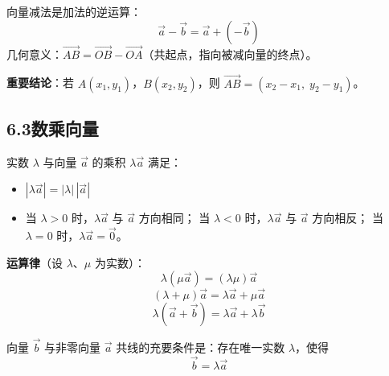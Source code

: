 \documentclass[12pt, a4paper]{ctexart}
\begin{document}
\begin{knowledgebox}[向量减法]
向量减法是加法的逆运算：
\[
\vec{a} - \vec{b} = \vec{a} + (-\vec{b})
\]
几何意义：$\overrightarrow{AB} = \overrightarrow{OB} - \overrightarrow{OA}$（共起点，指向被减向量的终点）。

\medskip
\textbf{重要结论}：若 $A(x_1,y_1)$，$B(x_2,y_2)$，则
$\overrightarrow{AB} = (x_2 - x_1,\; y_2 - y_1)$。
\end{knowledgebox}

\begin{center}
\end{center}

\subsection*{6.3\quad 数乘向量}

\begin{knowledgebox}[数乘向量的定义与运算律]
实数 $\lambda$ 与向量 $\vec{a}$ 的乘积 $\lambda\vec{a}$ 满足：
\begin{itemize}[leftmargin=2em]
  \item $|\lambda\vec{a}| = |\lambda|\,|\vec{a}|$
  \item 当 $\lambda > 0$ 时，$\lambda\vec{a}$ 与 $\vec{a}$ 方向相同；
        当 $\lambda < 0$ 时，$\lambda\vec{a}$ 与 $\vec{a}$ 方向相反；
        当 $\lambda = 0$ 时，$\lambda\vec{a} = \vec{0}$。
\end{itemize}

\medskip
\textbf{运算律}（设 $\lambda$、$\mu$ 为实数）：
\[
\lambda(\mu\vec{a}) = (\lambda\mu)\vec{a}
\]
\[
(\lambda + \mu)\vec{a} = \lambda\vec{a} + \mu\vec{a}
\]
\[
\lambda(\vec{a} + \vec{b}) = \lambda\vec{a} + \lambda\vec{b}
\]
\end{knowledgebox}

\begin{tipbox}[向量共线定理]
向量 $\vec{b}$ 与非零向量 $\vec{a}$ 共线的充要条件是：存在唯一实数 $\lambda$，使得
\[
\vec{b} = \lambda\vec{a}
\]
\end{tipbox}
\end{document}
